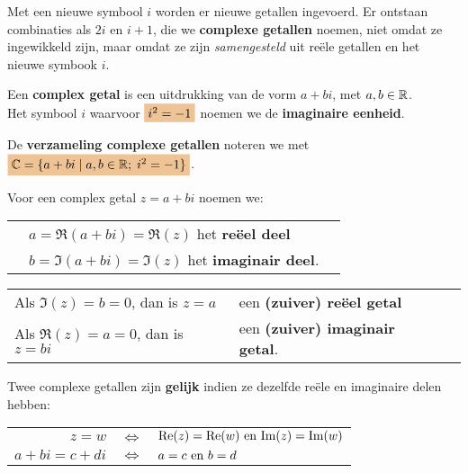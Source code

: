 \documentclass{ximera}
\begin{document}
	\author{Wim Obbels}
	\label{xim:cmplx_definitie_algebraisch}
    
Met een nieuwe symbool $i$  worden er nieuwe getallen ingevoerd. 
Er ontstaan combinaties als $2i$ en $i+1$, die we \textbf{complexe getallen} noemen, niet omdat ze ingewikkeld zijn, maar omdat ze zijn \textit{samengesteld}  uit reële getallen en het nieuwe symbook $i$.


\begin{definition}\label{def:complex_getal}\label{def:reeel_deel}\label{def:imaginair_deel}\nl
	
    Een \textbf{complex getal} is een uitdrukking van de vorm \(a+bi\), met \(a,b \in \mathbb{R}\).
    \\
    Het symbool \(i\) waarvoor \( \important{i^2=-1}\) noemen we de \textbf{imaginaire eenheid}.
    
De \textbf{verzameling complexe getallen} noteren we met \(\important{\C=\{a+bi \;|\; a,b\in\R;\; i^2=-1\}} \).

Voor een complex getal $z=a+bi$ noemen we: \\
\begin{tabular}{@{\quad}l@{ }ll}    
    & $a=\Re(a+bi)=\Re(z)$ het \textbf{reëel deel}  \\
    & $b=\Im(a+bi)=\Im(z)$ het \textbf{imaginair deel}.
\end{tabular}

\begin{tabular}{@{}l@{ }ll}    
    Als $\Im(z) = b=0$, dan is $z=a$ & een \textbf{(zuiver) re\"eel getal}  \\%
    Als $\Re(z) = a=0$, dan is $z=bi$ & een \textbf{(zuiver) imaginair getal}.
\end{tabular}
    
    
Twee complexe getallen zijn \textbf{gelijk} indien ze  dezelfde reële en imaginaire delen hebben:
\vspace{-0.35cm}
\begin{center}
    \begin{tabular}{rcl}
        \(z = w\) &\(\iff\)& \(\text{Re}(z)=\text{Re}(w) \text{ en } \text{Im}(z)=\text{Im}(w)\) \\    
        \(a+bi = c + di \)  &\(\iff\)& \(a = c \text{ en } b = d \)\\   
    \end{tabular}
\end{center}

\end{definition}
\end{document}
